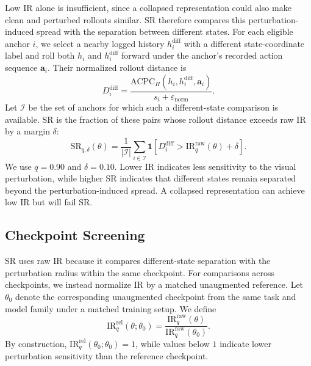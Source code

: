 \documentclass{article}
\begin{document}
Low IR alone is insufficient, since a collapsed representation could also make
clean and perturbed rollouts similar. SR therefore compares this
perturbation-induced spread with the separation between different states.
For each eligible anchor $i$, we select a nearby logged history
$h_i^{\mathrm{diff}}$ with a different state-coordinate label and roll both
$h_i$ and $h_i^{\mathrm{diff}}$ forward under the anchor's recorded action
sequence $\mathbf a_i$. Their normalized rollout distance is
\begin{equation}
D_i^{\mathrm{diff}}
=
\frac{
\mathrm{ACPC}_H(h_i, h_i^{\mathrm{diff}},\mathbf a_i)
}{
s_i+\varepsilon_{\mathrm{norm}}
}.
\label{eq:different-state-distance}
\end{equation}
Let $\mathcal I$ be the set of anchors for which such a different-state
comparison is available. SR is the fraction of these pairs whose rollout
distance exceeds raw IR by a margin $\delta$:
\begin{equation}
\mathrm{SR}_{q,\delta}(\theta)
=
\frac{1}{|\mathcal I|}
\sum_{i\in\mathcal I}
\mathbf 1\!\left[
D_i^{\mathrm{diff}}
>
\mathrm{IR}^{\mathrm{raw}}_q(\theta)+\delta
\right].
\label{eq:sr}
\end{equation}
We use $q=0.90$ and $\delta=0.10$. Lower IR indicates less sensitivity to the
visual perturbation, while higher SR indicates that different states remain
separated beyond the perturbation-induced spread. A collapsed representation
can achieve low IR but will fail SR.


\subsection{Checkpoint Screening}
\label{sec:checkpoint-threshold-selection}

SR uses raw IR because it compares different-state separation with the
perturbation radius within the same checkpoint. For comparisons across
checkpoints, we instead normalize IR by a matched unaugmented reference. Let
$\theta_0$ denote the corresponding unaugmented checkpoint from the same task
and model family under a matched training setup. We define
\begin{equation}
\mathrm{IR}^{\mathrm{rel}}_{q}(\theta;\theta_0)
=
\frac{\mathrm{IR}^{\mathrm{raw}}_{q}(\theta)}
{\mathrm{IR}^{\mathrm{raw}}_{q}(\theta_0)}.
\label{eq:ir-relative}
\end{equation}
By construction, $\mathrm{IR}^{\mathrm{rel}}_{q}(\theta_0;\theta_0)=1$, while
values below $1$ indicate lower perturbation sensitivity than the reference
checkpoint.
\end{document}
